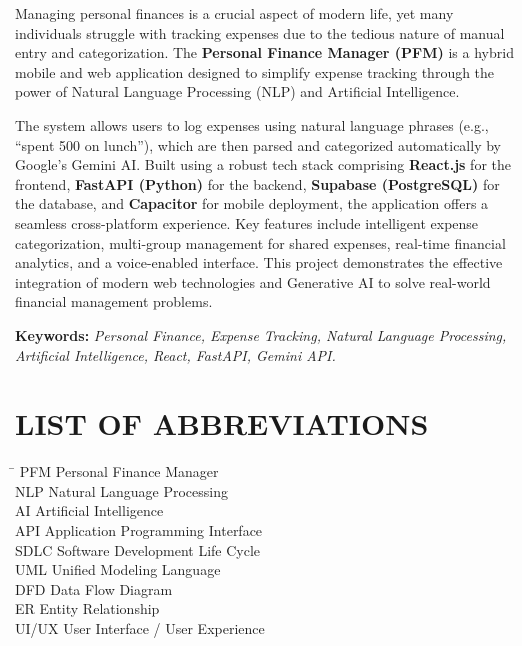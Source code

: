 \documentclass[12pt, a4paper]{report}
\begin{document}
Managing personal finances is a crucial aspect of modern life, yet many individuals struggle with tracking expenses due to the tedious nature of manual entry and categorization. The \textbf{Personal Finance Manager (PFM)} is a hybrid mobile and web application designed to simplify expense tracking through the power of Natural Language Processing (NLP) and Artificial Intelligence.

The system allows users to log expenses using natural language phrases (e.g., ``spent 500 on lunch''), which are then parsed and categorized automatically by Google's Gemini AI. Built using a robust tech stack comprising \textbf{React.js} for the frontend, \textbf{FastAPI (Python)} for the backend, \textbf{Supabase (PostgreSQL)} for the database, and \textbf{Capacitor} for mobile deployment, the application offers a seamless cross-platform experience. Key features include intelligent expense categorization, multi-group management for shared expenses, real-time financial analytics, and a voice-enabled interface. This project demonstrates the effective integration of modern web technologies and Generative AI to solve real-world financial management problems.

\vspace{0.5cm}
\noindent \textbf{Keywords:} \textit{Personal Finance, Expense Tracking, Natural Language Processing, Artificial Intelligence, React, FastAPI, Gemini API.}

\newpage
\tableofcontents

\newpage
\listoffigures

\newpage
\listoftables

\newpage
\chapter*{LIST OF ABBREVIATIONS}
\begin{tabbing}
    \hspace{3cm} \= \kill
    PFM \> Personal Finance Manager \\
    NLP \> Natural Language Processing \\
    AI \> Artificial Intelligence \\
    API \> Application Programming Interface \\
    SDLC \> Software Development Life Cycle \\
    UML \> Unified Modeling Language \\
    DFD \> Data Flow Diagram \\
    ER \> Entity Relationship \\
    UI/UX \> User Interface / User Experience
\end{tabbing}
\end{document}
